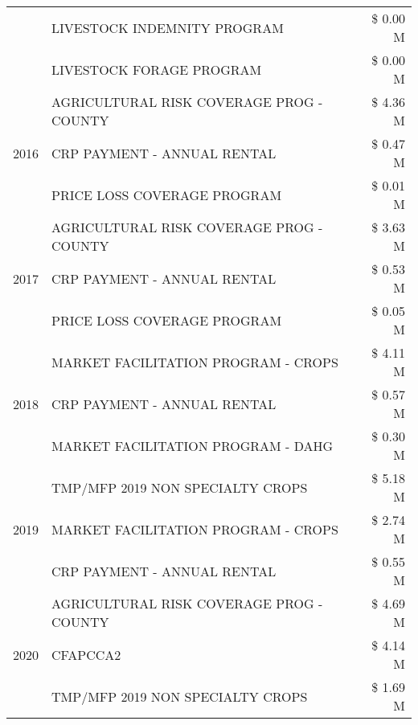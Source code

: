 \begin{tabular}{llr}
 & LIVESTOCK INDEMNITY PROGRAM & \$ 0.00 M \\
 & LIVESTOCK FORAGE PROGRAM & \$ 0.00 M \\
\cline{1-3}
\multirow[t]{3}{*}{2016} & AGRICULTURAL RISK COVERAGE PROG - COUNTY      & \$ 4.36 M \\
 & CRP PAYMENT - ANNUAL RENTAL                   & \$ 0.47 M \\
 & PRICE LOSS COVERAGE PROGRAM                   & \$ 0.01 M \\
\cline{1-3}
\multirow[t]{3}{*}{2017} & AGRICULTURAL RISK COVERAGE PROG - COUNTY & \$ 3.63 M \\
 & CRP PAYMENT - ANNUAL RENTAL & \$ 0.53 M \\
 & PRICE LOSS COVERAGE PROGRAM & \$ 0.05 M \\
\cline{1-3}
\multirow[t]{3}{*}{2018} & MARKET FACILITATION PROGRAM - CROPS & \$ 4.11 M \\
 & CRP PAYMENT - ANNUAL RENTAL & \$ 0.57 M \\
 & MARKET FACILITATION PROGRAM - DAHG & \$ 0.30 M \\
\cline{1-3}
\multirow[t]{3}{*}{2019} & TMP/MFP 2019 NON SPECIALTY CROPS & \$ 5.18 M \\
 & MARKET FACILITATION PROGRAM - CROPS & \$ 2.74 M \\
 & CRP PAYMENT - ANNUAL RENTAL & \$ 0.55 M \\
\cline{1-3}
\multirow[t]{3}{*}{2020} & AGRICULTURAL RISK COVERAGE PROG - COUNTY & \$ 4.69 M \\
 & CFAPCCA2 & \$ 4.14 M \\
 & TMP/MFP 2019 NON SPECIALTY CROPS & \$ 1.69 M \\
\cline{1-3}
\bottomrule
\end{tabular}
